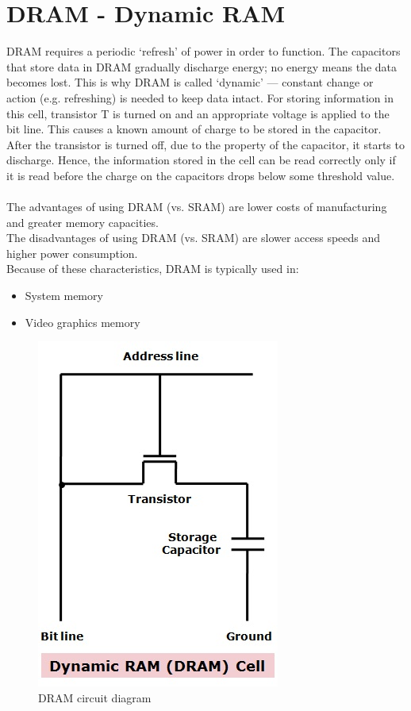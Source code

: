 \documentclass[a4paper,12pt]{article}
\begin{document}
\section{DRAM - Dynamic RAM}
DRAM requires a periodic ‘refresh’ of power in order to function. The capacitors that store data in DRAM gradually discharge energy; no energy means the data becomes lost. This is why DRAM is called ‘dynamic’ — constant change or action (e.g. refreshing) is needed to keep data intact. For storing information in this cell, transistor T is turned on and an appropriate voltage is applied to the bit line. This causes a known amount of charge to be stored in the capacitor. After the transistor is turned off, due to the property of the capacitor, it starts to discharge. Hence, the information stored in the cell can be read correctly only if it is read before the charge on the capacitors drops below some threshold value.
\\
\\The advantages of using DRAM (vs. SRAM) are lower costs of manufacturing and greater memory capacities.
\\The disadvantages of using DRAM (vs. SRAM) are slower access speeds and higher power consumption. 
\\Because of these characteristics, DRAM is typically used in:
	\begin{itemize}
		\item System memory
		\item Video graphics memory
	\end{itemize}

	\begin{figure}[H]
	\begin{center}
		\includegraphics{DRAM.jpg}
		\caption{DRAM circuit diagram}
	\end{center}
	\end{figure}
\end{document}
